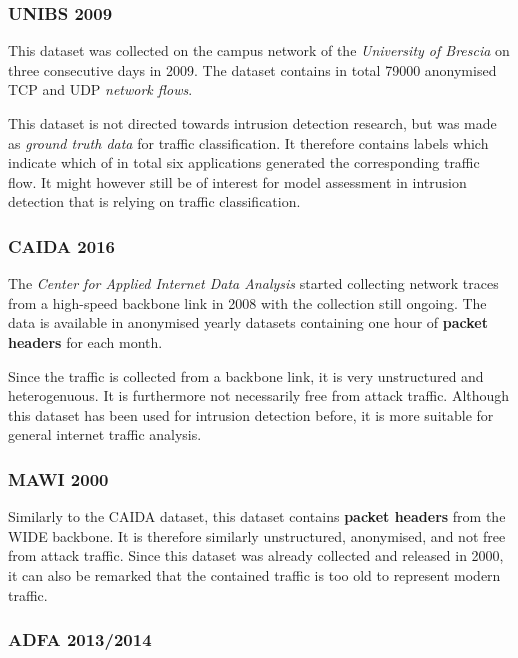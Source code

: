 \documentclass[a4paper,12pt,twoside]{report}
\begin{document}
\subsubsection*{UNIBS 2009\cite{UNIBS2009data}}

This dataset was collected on the campus network of the \textit{University of Brescia} on three consecutive days in 2009. The dataset contains in total 79000 anonymised TCP and UDP \textit{network flows}. 

This dataset is not directed towards intrusion detection research, but was made as \textit{ground truth data} for traffic classification. It therefore contains labels which indicate which of in total six applications generated the corresponding traffic flow. It might however still be of interest for model assessment in intrusion detection that is relying on traffic classification.

\subsubsection*{CAIDA 2016 \cite{walsworth2015caida}}

The \textit{Center for Applied Internet Data Analysis} started collecting network traces from a high-speed backbone link in 2008 with the collection still ongoing. The data is available in anonymised yearly datasets containing one hour of \textbf{packet headers} for each month. 

Since the traffic is collected from a backbone link, it is very unstructured and heterogenuous. It is furthermore not necessarily free from attack traffic. Although this dataset has been used for intrusion detection before, it is more suitable for general internet traffic analysis.


\subsubsection*{MAWI 2000 \cite{sony2000traffic}}



Similarly to the CAIDA dataset, this dataset contains \textbf{packet headers} from the WIDE backbone. It is therefore similarly unstructured, anonymised, and not free from attack traffic. Since this dataset was already collected and released in 2000, it can also be remarked that the contained traffic is too old to represent modern traffic. 

\subsubsection*{ADFA 2013/2014 \cite{creech2014developing,creech2013generation}}
\end{document}
